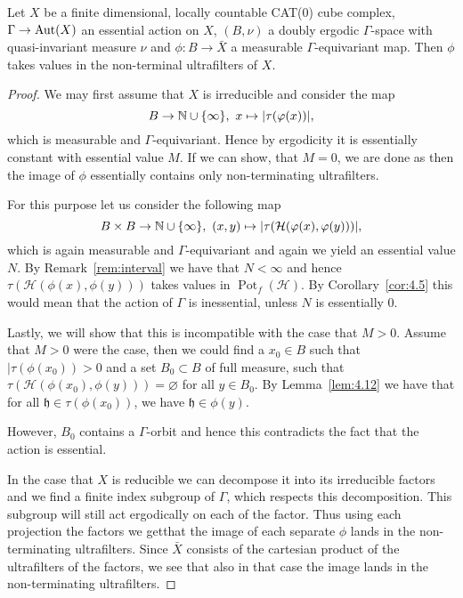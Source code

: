 \begin{lemma}[{\cite[Lemma~4.11]{MR3509968}}]
  \label{lem:4.11}
  Let \(X\) be a finite dimensional, locally countable CAT(0) cube complex, \(\Gamma \to \operatorname{Aut}(X)\) an essential action on \(X\), \((B, \nu)\) a doubly ergodic \(\Gamma\)-space with quasi-invariant measure \(\nu\) and \(\phi\colon B \to \bar X\) a measurable \(\Gamma\)-equivariant map. Then \(\phi\) takes values in the non-terminal ultrafilters of \(X\).
\end{lemma}

\begin{proof}
  We may first assume that \(X\) is irreducible and consider the map
  \[
    B \to \mathbb{N} \cup \{\infty\},\ x \mapsto |\tau(\varphi(x))|,
  \]
  which is measurable and \(\Gamma\)-equivariant. Hence by ergodicity it is essentially constant with essential value \(M\). If we can show, that \(M = 0\), we are done as then the image of \(\phi\) essentially contains only non-terminating ultrafilters.

  For this purpose let us consider the following map
  \[
    B \times B \to \mathbb{N} \cup \{\infty\},\ (x,y) \mapsto |\tau(\mathcal{H}(\varphi(x), \varphi(y)))|,
  \]
  which is again measurable and \(\Gamma\)-equivariant and again we yield an essential value \(N\). By Remark~\ref{rem:interval} we have that \(N < \infty\) and hence \(\tau(\mathcal{H}(\phi(x), \phi(y)))\) takes values in \(\operatorname{Pot}_f(\mathcal{H})\). By Corollary~\ref{cor:4.5} this would mean that the action of \(\Gamma\) is inessential, unless \(N\) is essentially 0.

  Lastly, we will show that this is incompatible with the case that \(M > 0\). Assume that \(M > 0\) were the case, then we could find a \(x_0 \in B\) such that \(|\tau(\phi(x_0)) > 0\) and a set \(B_0 \subset B\) of full measure, such that \(\tau(\mathcal{H}(\phi(x_0), \phi(y))) = \varnothing\) for all \(y \in B_0\). By Lemma~\ref{lem:4.12} we have that for all \(\mathfrak{h} \in \tau(\phi(x_0))\), we have \(\mathfrak{h} \in \phi(y)\).

  However, \(B_0\) contains a \(\Gamma\)-orbit and hence this contradicts the fact that the action is essential.
  
  In the case that \(X\) is reducible we can decompose it into its irreducible factors and we find a finite index subgroup of \(\Gamma\), which respects this decomposition. This subgroup will still act ergodically on each of the factor. Thus using each projection the factors we getthat the image of each separate \(\phi\) lands in the non-terminating ultrafilters. Since \(\bar X\) consists of the cartesian product of the ultrafilters of the factors, we see that also in that case the image lands in the non-terminating ultrafilters.
\end{proof}

